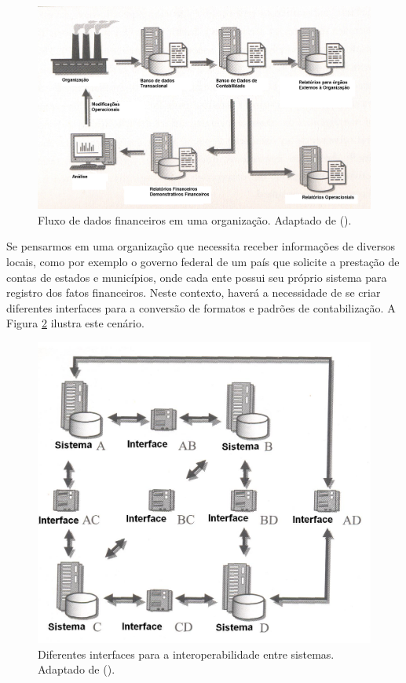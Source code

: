\documentclass[msc,proposal,hidelot,hideabstract]{ppgccufmg} %
\begin{document}
\begin{figure}[hbtp]
\centering
\includegraphics[width=.75\textwidth]{img/fluxo_informacoes.png}
\caption{Fluxo de dados financeiros em uma organização. Adaptado de (\cite{bergeron2004essentials}).}
\label{fig:fluxo_dados}
\end{figure}

Se pensarmos em uma organização que necessita receber informações de diversos locais, como por exemplo o governo federal de um país que solicite a prestação de contas de estados e municípios, onde cada ente possui seu próprio sistema para registro dos fatos financeiros. Neste contexto, haverá a necessidade de se criar diferentes interfaces para a conversão de formatos e padrões de contabilização. A Figura \ref{fig:interfaces} ilustra este cenário.


\begin{figure}[hbtp]
\centering
\includegraphics[width=.75\textwidth]{img/interfaces.png}
\caption{Diferentes interfaces para a interoperabilidade entre sistemas. Adaptado de (\cite{bergeron2004essentials}).}
\label{fig:interfaces}
\end{figure}
\end{document}
